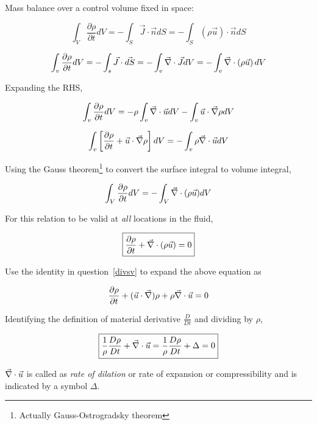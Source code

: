 Mass balance over a control volume fixed in space:

\begin{equation}
	\int_{V}{\frac{\partial \rho}{\partial t} dV} = -\int_{S}{\vec{J} \cdot\vec{n}dS} = -\int_{S}{\left( \rho\vec{u} \right) \cdot\vec{n}dS}
\end{equation} 

$$ \int_{v}{{\partial \rho \over \partial t} dV} = - \int_{s}{\vec{J} \cdot \vec{dS}} = - \int_{v}{\vec{\nabla} \cdot \vec{J} dV} = - \int_{v}{\vec{\nabla} \cdot \left(\rho \vec{u} \right) dV} $$

Expanding the RHS,

$$ \int_{v}{{\partial \rho \over \partial t} dV} = - \rho \int_{v}{\vec{\nabla} \cdot \vec{u} dV} - \int_{v}{ \vec{u} \cdot \vec{\nabla} \rho dV} $$

$$ \int_{v}{\left[{\partial \rho \over \partial t} + \vec{u} \cdot \vec{\nabla} \rho\right] dV} = - \int_{v}{ \rho \vec{\nabla} \cdot \vec{u} dV} $$


Using the Gauss theorem\footnote{Actually Gauss-Ostrogradsky theorem} to convert the surface integral to volume integral,

\begin{equation}
\int_{V}{\frac{\partial \rho}{\partial t} dV} = -\int_{V}{\vec{\nabla}\cdot(\rho\vec{u})dV}
\end{equation} 

For this relation to be valid at {\em all} locations in the fluid,


\begin{equation}
\label{conteq1}
\boxed{\frac{\partial \rho}{\partial t} +  \vec{\nabla}\cdot(\rho\vec{u}) = 0}
\end{equation}


Use the identity in question~\ref{divsv} to expand the above equation as

\begin{equation}
\frac{\partial \rho}{\partial t} + (\vec{u}\cdot\vec{\nabla})\rho + \rho\vec{\nabla}\cdot\vec{u}  = 0
\end{equation} 

Identifying the definition of material derivative $\frac{D}{Dt}$ and dividing by $\rho$,

\begin{equation}
\label{conteq2}
\boxed{\frac{1}{\rho}\frac{D \rho}{D t} + \vec{\nabla}\cdot\vec{u}  = \frac{1}{\rho}\frac{D \rho}{D t} + \Delta = 0}
\end{equation} 

$\vec{\nabla}\cdot\vec{u}$ is called as {\em rate of dilation} or rate of expansion or compressibility and is indicated by a symbol $\Delta$.

